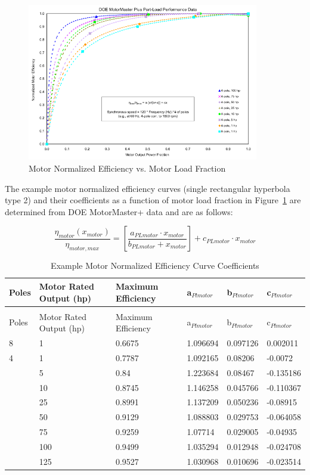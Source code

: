 {{{\begin{figure}[hbtp] %
\centering
\includegraphics[width=0.9\textwidth, height=0.9\textheight, keepaspectratio=true]{media/image4919.svg.png}
\caption{Motor Normalized Efficiency vs. Motor Load Fraction \protect \label{fig:motor-normalized-efficiency-vs.-motor-load}}
\end{figure}

The example motor normalized efficiency curves (single rectangular hyperbola type 2) and their coefficients as a function of motor load fraction in Figure~\ref{fig:motor-normalized-efficiency-vs.-motor-load} are determined from DOE MotorMaster+ data and are as follows:

\begin{equation}
\frac{{{\eta_{motor}}({x_{motor}})}}{{{\eta_{motor,max}}}} = \left[ {\frac{{{a_{PLmotor}} \cdot {x_{motor}}}}{{{b_{PLmotor}} + {x_{motor}}}}} \right] + {c_{PLmotor}} \cdot {x_{motor}}
\end{equation}

\begin{longtable}[c]{p{1.0in}p{1.0in}p{1.0in}p{1.0in}p{1.0in}p{1.0in}}
\caption{Example Motor Normalized Efficiency Curve Coefficients \label{table:example-motor-normalized-efficiency-curve}} \tabularnewline
\toprule 
Poles & Motor Rated Output (hp) & Maximum Efficiency & a\(_{Plmotor}\) & b\(_{Plmotor}\) & c\(_{Plmotor}\) \tabularnewline \midrule
\midrule
\endfirsthead

\caption[]{Example Motor Normalized Efficiency Curve Coefficients} \tabularnewline
\toprule 
Poles & Motor Rated Output (hp) & Maximum Efficiency & a\(_{Plmotor}\) & b\(_{Plmotor}\) & c\(_{Plmotor}\) \tabularnewline \midrule
\midrule
\endhead

8 & 1 & 0.6675 & 1.096694 & 0.097126 & 0.002011 \tabularnewline
4 & 1 & 0.7787 & 1.092165 & 0.08206 & -0.0072 \tabularnewline
 & 5 & 0.84 & 1.223684 & 0.08467 & -0.135186 \tabularnewline
 & 10 & 0.8745 & 1.146258 & 0.045766 & -0.110367 \tabularnewline
 & 25 & 0.8991 & 1.137209 & 0.050236 & -0.08915 \tabularnewline
 & 50 & 0.9129 & 1.088803 & 0.029753 & -0.064058 \tabularnewline
 & 75 & 0.9259 & 1.07714 & 0.029005 & -0.04935 \tabularnewline
 & 100 & 0.9499 & 1.035294 & 0.012948 & -0.024708 \tabularnewline
 & 125 & 0.9527 & 1.030968 & 0.010696 & -0.023514 \tabularnewline
\bottomrule
\end{longtable}

}}}
